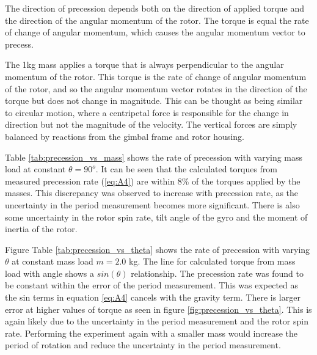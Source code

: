 \documentclass[8pt]{article}
\begin{document}

The direction of precession depends both on the direction of applied torque and the direction of the angular momentum of the rotor.
The torque is equal the rate of change of angular momentum, which causes the angular momentum vector to precess.


The 1kg mass applies a torque that is always perpendicular to the angular momentum of the rotor.
This torque is the rate of change of angular momentum of the rotor, and so the angular momentum vector rotates in the direction of the torque but does not change in magnitude.
This can be thought as being similar to circular motion, where a centripetal force is responsible for the change in direction but not the magnitude of the velocity.
The vertical forces are simply balanced by reactions from the gimbal frame and rotor housing.

Table \ref{tab:precession_vs_mass} shows the rate of precession with varying mass load at constant $\theta = 90^o$.
It can be seen that the calculated torques from measured precession rate (\ref{eq:A4}) are within 8\% of the torques applied by the masses.
This discrepancy was observed to increase with precession rate, as the uncertainty in the period measurement becomes more significant.
There is also some uncertainty in the rotor spin rate, tilt angle of the gyro and the moment of inertia of the rotor.


Figure Table \ref{tab:precession_vs_theta} shows the rate of precession with varying $\theta$ at constant mass load $m = 2.0$ kg.
The line for calculated torque from mass load with angle shows a $sin(\theta)$ relationship.
The precession rate was found to be constant within the error of the period measurement.
This was expected as the sin terms in equation \ref{eq:A4} cancels with the gravity term.
There is larger error at higher values of torque as seen in figure \ref{fig:precession_vs_theta}.
This is again likely due to the uncertainty in the period measurement and the rotor spin rate.
Performing the experiment again with a smaller mass would increase the period of rotation and reduce the uncertainty in the period measurement.
\end{document}
